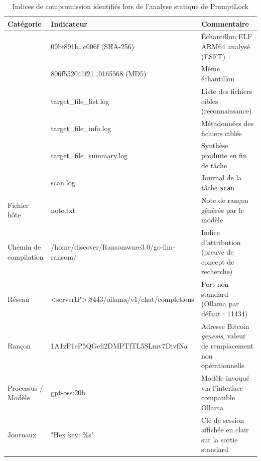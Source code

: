 \begin{table}[htbp]
  \centering
  \small
  \setlength{\parindent}{0pt}
  \setlength{\tabcolsep}{5pt}
  \renewcommand{\arraystretch}{1.25}
  \caption{Indices de compromission identifiés lors de l'analyse statique de PromptLock}
  \label{tab:ioc-statique}
  \begin{tabularx}{\linewidth}{@{}
      >{\RaggedRight\arraybackslash}p{2.4cm}
      >{\ttfamily\RaggedRight\arraybackslash}p{4.4cm}
      >{\RaggedRight\arraybackslash}X @{}}
    \toprule
    \textbf{Catégorie} & \normalfont\bfseries Indicateur & \textbf{Commentaire} \\
    \midrule
    \multirow{2}{2.4cm}{Condensat}
      & 09bf891b\allowbreak\ldots c006f \normalfont(SHA-256)
      & Échantillon ELF ARM64 analysé (ESET) \\
      & 806f5520\allowbreak41f21\allowbreak\ldots 0165568 \normalfont(MD5)
      & Même échantillon \\
    \addlinespace
    \multirow{4}{2.4cm}{Fichier hôte}
      & target\_file\_list.log      & Liste des fichiers cibles (reconnaissance) \\
      & target\_file\_info.log      & Métadonnées des fichiers ciblés \\
      & target\_file\_summary.log   & Synthèse produite en fin de tâche \\
      & scan.log                    & Journal de la tâche \texttt{scan} \\
    \addlinespace
    Fichier hôte
      & note.txt                    & Note de rançon générée par le modèle \\
    \addlinespace
    Chemin de compilation
      & /home/discover/\allowbreak Ransomware3.0/\allowbreak go-llm-ransom/
      & Indice d'attribution (preuve de concept de recherche) \\
    \addlinespace
    Réseau
      & <serverIP>:8443/\allowbreak ollama/v1/\allowbreak chat/completions
      & Port non standard (Ollama par défaut : 11434) \\
    \addlinespace
    Rançon
      & 1A1zP1eP5QGefi2\allowbreak DMPTfTL5SLmv7\allowbreak DivfNa
      & Adresse Bitcoin \emph{genesis}, valeur de remplacement non opérationnelle \\
    \addlinespace
    Processus / Modèle
      & gpt-oss:20b
      & Modèle invoqué via l'interface compatible Ollama \\
    \addlinespace
    Journaux
      & "Hex key: \%s"
      & Clé de session affichée en clair sur la sortie standard \\
    \bottomrule
  \end{tabularx}
\end{table}

